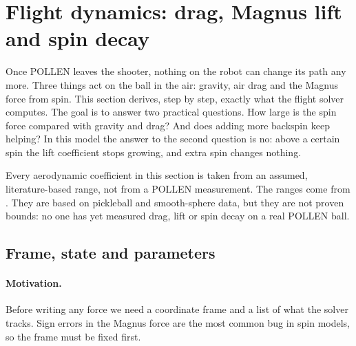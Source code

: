 \section{Flight dynamics: drag, Magnus lift and spin decay}
\label{sec:flight}


Once POLLEN leaves the shooter, nothing on the robot can change its path any more.
Three things act on the ball in the air: gravity, air drag and the Magnus force from spin.
This section derives, step by step, exactly what the flight solver  computes.
The goal is to answer two practical questions.
How large is the spin force compared with gravity and drag?
And does adding more backspin keep helping?
In this model the answer to the second question is no: above a certain spin the lift coefficient
stops growing, and extra spin changes nothing.

Every aerodynamic coefficient in this section is taken from an assumed, literature-based range, not
from a POLLEN measurement.
The ranges come from .
They are based on pickleball and smooth-sphere data, but they are not proven bounds: no one has yet
measured drag, lift or spin decay on a real POLLEN ball.

\subsection{Frame, state and parameters}
\label{sec:flight-frame}

\paragraph{Motivation.}
Before writing any force we need a coordinate frame and a list of what the solver tracks.
Sign errors in the Magnus force are the most common bug in spin models, so the frame must be fixed first.

